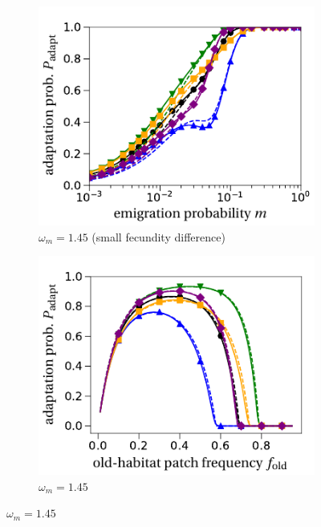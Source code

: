 \documentclass[a4paper,11pt]{article}
\begin{document}
\begin{figure}[t!]
\begin{subfigure}{.5\textwidth}
 		 \includegraphics[width=\linewidth]{fig3c.pdf}
  		\caption{$\omega_m=1.45$  (small fecundity difference)}
	\end{subfigure}%
	\begin{subfigure}{.5\textwidth}
  		\centering
  		\includegraphics[width=\linewidth]{fig3d.pdf}
  		\caption{$\omega_m=1.45$}
	\end{subfigure}

\end{figure}
\end{document}
